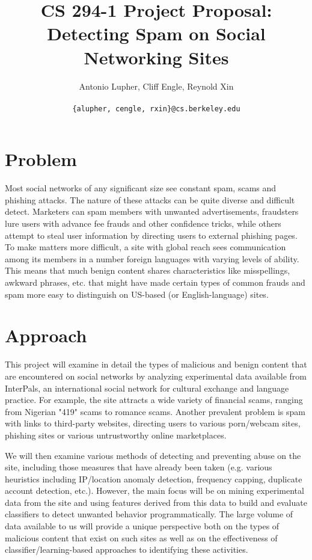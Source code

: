 \documentclass[preprint]{acm_proc_article-sp}
\begin{document}
\title{CS 294-1 Project Proposal: \\
Detecting Spam on Social Networking Sites}

\author{
Antonio Lupher,
Cliff Engle,
Reynold Xin\\\\
\texttt{\{alupher, cengle, rxin\}@cs.berkeley.edu}
}

\maketitle

\section{Problem}

Most social networks of any significant size see constant spam, scams
and phishing attacks. The nature of these attacks can be quite diverse
and difficult detect. Marketers can spam members with unwanted
advertisements, fraudsters lure users with advance fee frauds and
other confidence tricks, while others attempt to steal user
information by directing users to external phishing pages. To make
matters more difficult, a site with global reach sees communication
among its members in a number foreign languages with varying levels
of ability. This means that much benign content shares characteristics
like misspellings, awkward phrases, etc. that might have made certain
types of common frauds and spam more easy to distinguish on US-based
(or English-language) sites.

\section{Approach}

This project will examine in detail the types of malicious and benign
content that are encountered on social networks by analyzing
experimental data available from InterPals, an international social network
for cultural exchange and language practice. For example, the site
attracts a wide variety of financial scams, ranging from Nigerian
"419" scams to romance scams. Another prevalent problem is spam with
links to third-party websites, directing users to various porn/webcam
sites, phishing sites or various untrustworthy online marketplaces.

We will then examine various methods of detecting and preventing abuse
on the site, including those measures that have already been taken
(e.g. various heuristics including IP/location anomaly detection,
frequency capping, duplicate account detection, etc.). However, the
main focus will be on mining experimental data from the site and using
features derived from this data to build and evaluate classifiers to
detect unwanted behavior programmatically. The large volume of data
available to us will provide a unique perspective both on the types of
malicious content that exist on such sites as well as on the
effectiveness of classifier/learning-based approaches to identifying
these activities.
\end{document}
